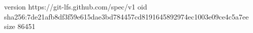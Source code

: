 version https://git-lfs.github.com/spec/v1
oid sha256:7de21afb8df3f59e615dae3bd784457cd8191645892974ec1003e09ce4c5a7ee
size 86451
